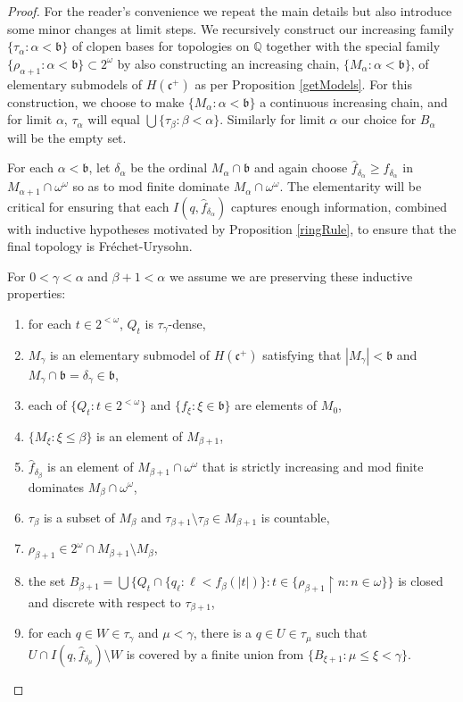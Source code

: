 \documentclass[10pt,a4paper]{amsart}
\begin{document}
\begin{proof} For the reader's convenience we repeat
the main details but also introduce some minor changes at limit steps.
We recursively  construct
our  increasing family $\{ \tau_\alpha : \alpha < \mathfrak b\}$
of clopen bases for topologies on $\mathbb Q$ together with 
the special  family
 $\{ \rho_{\alpha+1} : \alpha < \mathfrak b\}
 \subset 2^\omega$ 
 by also constructing an increasing chain,
  $\{ M_\alpha : \alpha < \mathfrak b\}$,
 of elementary
 submodels of $H(\mathfrak c^+)$ as per Proposition \ref{getModels}.
 For this construction, we choose to make $\{ M_\alpha :\alpha <\mathfrak b\}$
  a continuous increasing chain,  and for limit $\alpha$,
    $\tau_\alpha $ will equal $\bigcup\{ \tau_\beta : \beta < \alpha\}$. 
Similarly for limit $\alpha$ our choice for $B_\alpha$ will be the empty set.

 For each $\alpha <\mathfrak b$,  
  let $\delta_\alpha$ be the ordinal
    $M_\alpha\cap \mathfrak b$  and again choose $\hat f_{\delta_\alpha}
    \geq f_{\delta_\alpha}$
    in $M_{\alpha+1}\cap \omega^\omega$ so as to 
    mod finite dominate $M_\alpha\cap \omega^\omega$.
  The elementarity will be
    critical for ensuring that each $I(q,\hat f_{\delta_\alpha})$ 
    captures enough information,
    combined with inductive hypotheses motivated by
    Proposition \ref{ringRule},
    to ensure that the final
    topology is Fr\'echet-Urysohn.

For $0<\gamma  < \alpha$
 and $\beta+1 < \alpha$ we assume we are preserving
these inductive properties:
   
\begin{enumerate}
\item for each $t\in 2^{<\omega}$, $Q_t$ is $\tau_{\gamma}$-dense,
\item $M_\gamma$ is an elementary submodel  of $H(\mathfrak c^+)$
satisfying that $|M_\gamma|<\mathfrak b$ and $M_\gamma\cap \mathfrak b = 
 \delta_\gamma\in \mathfrak b$,
 \item each of $ \{Q_t:t\in 2^{<\omega}\}$ and $\{f_\xi: \xi\in\mathfrak b\}$
  are elements of $M_0$,
\item  $\{ M_\xi : \xi\leq \beta\}$ is an  element  of $M_{\beta+1}$,
\item $\hat f_{\delta_\beta}$ is an element of $M_{\beta+1}\cap \omega^\omega$
that is strictly increasing and mod finite dominates $M_\beta\cap \omega^\omega$,
\item   $\tau_\beta$ is a subset of $M_\beta$  and $\tau_{\beta+1}\setminus \tau_\beta\in M_{\beta+1}$ is countable,
\item $\rho_{\beta+1}\in 2^\omega\cap M_{\beta+1} \setminus M_\beta $,
 \item the\label{H3} set $B_{\beta+1} = \bigcup\{ Q_t \cap \{ q_\ell : \ell < f_{\beta}(|t|) \}: 
  t\in \{ \rho_{\beta+1}\restriction n : n\in \omega\}\}$
is closed and discrete with respect to 
$\tau_{\beta+1}$,
 \item for\label{mH1} each $q\in W\in \tau_\gamma$ and $\mu<\gamma$, there is a
 $q\in U\in \tau_\mu$
 such that $ U\cap I(q,\hat f_{\delta_\mu}) \setminus W$ is 
 covered by a finite union from $\{ B_{\xi+1} : \mu \leq \xi < \gamma\}$.
\end{enumerate}


\end{proof}
\end{document}
